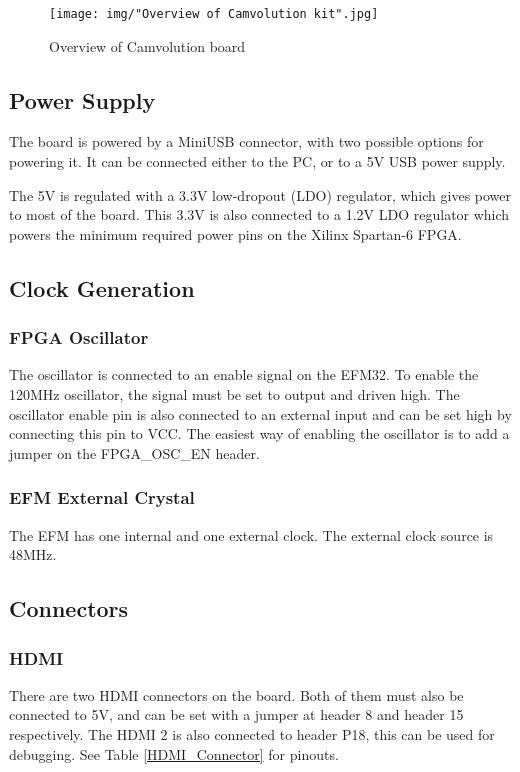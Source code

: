 \begin{figure}
    \texttt{[image: img/"Overview of Camvolution kit".jpg]}
    \caption{Overview of Camvolution board}
    \label{fig:BoardLayout}
\end{figure}

\subsection{Power Supply}
The board is powered by a MiniUSB connector, with two possible options for powering it.
It can be connected either to the PC, or to a 5V USB power supply.

The 5V is regulated with a 3.3V low-dropout (LDO) regulator, which gives power to most of the board.
This 3.3V is also connected to a 1.2V LDO regulator which powers the minimum required power pins on the Xilinx Spartan-6 FPGA.

\subsection{Clock Generation}
\subsubsection{FPGA Oscillator}
The oscillator is connected to an enable signal on the EFM32.
To enable the 120MHz oscillator, the signal must be set to output and driven high.
The oscillator enable pin is also connected to an external input and can be set high by connecting this pin to VCC.
The easiest way of enabling the oscillator is to add a jumper on the FPGA\_OSC\_EN header.

\subsubsection{EFM External Crystal}
The EFM has one internal and one external clock.
The external clock source is 48MHz.

\subsection{Connectors}
\subsubsection{HDMI}
There are two HDMI connectors on the board.
Both of them must also be connected to 5V, and can be set with a jumper at header 8 and header 15 respectively.
The HDMI 2 is also connected to header P18, this can be used for debugging.
See Table \ref{HDMI_Connector} for pinouts.

